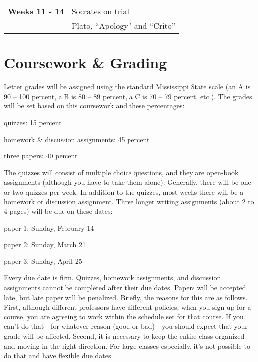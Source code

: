 \documentclass[11pt,oneside]{article}
\begin{document}
\begin{minipage}{\textwidth}
\begin{sffamily}
\begin{scriptsize}
\begin{tabular}{l l}
\rowcolor{blue3}\textbf{Weeks 11 - 14} & {Socrates on trial}\\
\rowcolor{blue2}&\quad Plato, ``Apology'' and ``Crito''\\

\hline
\end{tabular}
\end{scriptsize}
\end{sffamily}

\end{minipage}





\section{Coursework \& Grading}

Letter grades will be assigned using the standard Mississippi State scale (an A is 90 – 100 percent, a B is 80 – 89 percent, a C is 70 – 79 percent, etc.). The grades will be set based on this coursework and these percentages:
\begin{description}
\item quizzes: 15 percent
\item homework \& discussion assignments: 45 percent
\item three papers: 40 percent
\end{description}
The quizzes will consist of multiple choice questions, and they are open-book assignments
(although you have to take them alone). Generally, there will be one or two quizzes per week.
In addition to the quizzes, most weeks there will be a homework or discussion assignment. 
Three longer writing assignments (about 2 to 4 pages) will be due on these dates:
\begin{description}
\item paper 1: Sunday, February 14
\item paper 2: Sunday, March 21
\item paper 3: Sunday, April 25
\end{description}
Every due date is firm. Quizzes, homework assignments, and discussion assignments cannot be completed after their due dates. Papers will be accepted late, but late paper will be penalized. Briefly, the reasons for this are as follows. First, although different professors have different policies, when you sign up for a course, you are agreeing to work within the schedule set for that course. If you can’t do that—for whatever reason (good or bad)—you should expect that your grade will be affected. Second, it is necessary
to keep the entire class organized and moving in the right direction. For large classes especially, it’s not possible to do that and have flexible due dates.



%








\end{document}
